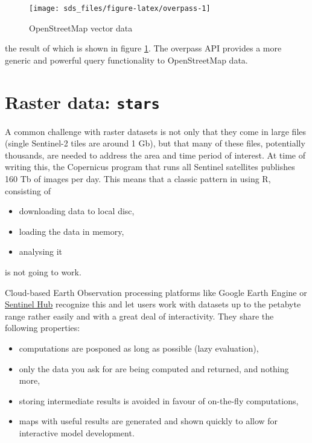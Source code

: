 \documentclass[]{book}
\providecommand{\tightlist}{%
  \setlength{\itemsep}{0pt}\setlength{\parskip}{0pt}}
\begin{document}
\begin{figure}

{\centering \texttt{[image: sds\_files/figure-latex/overpass-1]} 

}

\caption{OpenStreetMap vector data}\label{fig:overpass}
\end{figure}

the result of which is shown in figure \ref{fig:overpass}.
The overpass API provides a more generic and powerful query
functionality to OpenStreetMap data.

\hypertarget{raster-data-stars}{%
\section{\texorpdfstring{Raster data: \texttt{stars}}{Raster data: stars}}\label{raster-data-stars}}

A common challenge with raster datasets is not only that they come
in large files (single Sentinel-2 tiles are around 1 Gb), but that
many of these files, potentially thousands, are needed to address
the area and time period of interest. At time of writing this, the
Copernicus program that runs all Sentinel satellites publishes 160
Tb of images per day. This means that a classic pattern in using R,
consisting of

\begin{itemize}
\tightlist
\item
  downloading data to local disc,
\item
  loading the data in memory,
\item
  analysing it
\end{itemize}

is not going to work.

Cloud-based Earth Observation processing platforms like Google Earth
Engine \citep{gorelick} or \href{https://www.sentinel-hub.com/}{Sentinel Hub}
recognize this and let users work with datasets up to the petabyte
range rather easily and with a great deal of interactivity. They
share the following properties:

\begin{itemize}
\tightlist
\item
  computations are posponed as long as possible (lazy evaluation),
\item
  only the data you ask for are being computed and returned, and nothing more,
\item
  storing intermediate results is avoided in favour of on-the-fly computations,
\item
  maps with useful results are generated and shown quickly to allow for interactive model development.
\end{itemize}
\end{document}
